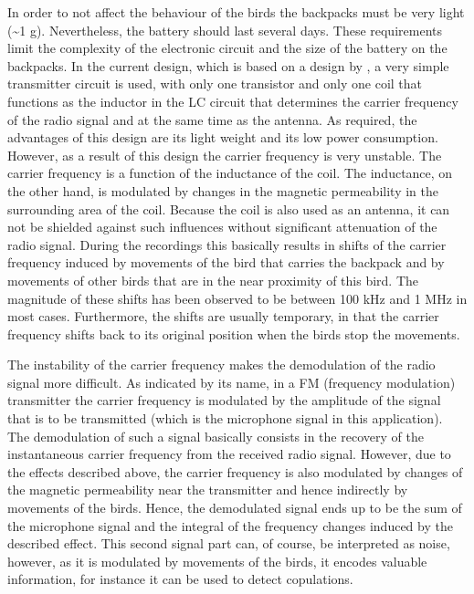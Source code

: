 \documentclass[10pt]{article}
\let\cite\citep
\providecommand\citet{\cite}
\providecommand\citep{\cite}
\begin{document}
In order to not affect the behaviour of the birds the backpacks must be
very light (\textasciitilde{}1 g). Nevertheless, the battery should last
several days. These requirements limit the complexity of the electronic
circuit and the size of the battery on the backpacks. In the current
design, which is based on a design by \citet{Ter_Maat_2014}, a very simple
transmitter circuit is used, with only one transistor and only one coil
that functions as the inductor in the LC circuit that determines the
carrier frequency of the radio signal and at the same time as the
antenna. As required, the advantages of this design are its light weight
and its low power consumption. However, as a result of this design the
carrier frequency is very unstable. The carrier frequency is a function
of the inductance of the coil. The inductance, on the other hand, is
modulated by changes in the magnetic permeability in the surrounding
area of the coil. Because the coil is also used as an antenna, it can
not be shielded against such influences without significant attenuation
of the radio signal. During the recordings this basically results in
shifts of the carrier frequency induced by movements of the bird that
carries the backpack and by movements of other birds that are in the
near proximity of this bird. The magnitude of these shifts has been
observed to be between 100 kHz and 1 MHz in most cases. Furthermore, the
shifts are usually temporary, in that the carrier frequency shifts back
to its original position when the birds stop the movements.

The instability of the carrier frequency makes the demodulation of the
radio signal more difficult. As indicated by its name, in a FM
(frequency modulation) transmitter the carrier frequency is modulated by
the amplitude of the signal that is to be transmitted (which is the
microphone signal in this application). The demodulation of such a
signal basically consists in the recovery of the instantaneous carrier
frequency from the received radio signal. However, due to the effects
described above, the carrier frequency is also modulated by changes of
the magnetic permeability near the transmitter and hence indirectly by
movements of the birds. Hence, the demodulated signal ends up to be the
sum of the microphone signal and the integral of the frequency changes
induced by the described effect. This second signal part can, of course,
be interpreted as noise, however, as it is modulated by movements of the
birds, it encodes valuable information, for instance it can be used to
detect copulations.
\end{document}
